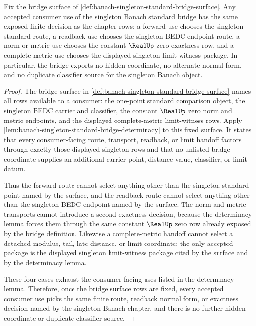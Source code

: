 \begin{corollary}
\label{cor:banach-singleton-standard-bridge-consumer-determinacy}
Fix the bridge surface of
\autoref{def:banach-singleton-standard-bridge-surface}. Any accepted
consumer use of the singleton Banach standard bridge has the same exposed
finite decision as the chapter rows: a forward use chooses the singleton
standard route, a readback use chooses the singleton BEDC endpoint route, a
norm or metric use chooses the constant $\RealUp$ zero exactness row, and a
complete-metric use chooses the displayed singleton limit-witness package. In
particular, the bridge exports no hidden coordinate, no alternate normal form,
and no duplicate classifier source for the singleton Banach object.
\end{corollary}
\begin{proof}
The bridge surface in
\autoref{def:banach-singleton-standard-bridge-surface} names all rows available
to a consumer: the one-point standard comparison object, the singleton BEDC
carrier and classifier, the constant $\RealUp$ zero norm and metric endpoints,
and the displayed complete-metric limit-witness rows. Apply
\autoref{lem:banach-singleton-standard-bridge-determinacy} to this fixed
surface. It states that every consumer-facing route, transport, readback, or
limit handoff factors through exactly those displayed singleton rows and that
no unlisted bridge coordinate supplies an additional carrier point, distance
value, classifier, or limit datum.

Thus the forward route cannot select anything other than the singleton
standard point named by the surface, and the readback route cannot select
anything other than the singleton BEDC endpoint named by the surface. The norm
and metric transports cannot introduce a second exactness decision, because
the determinacy lemma forces them through the same constant $\RealUp$ zero row
already exposed by the bridge definition. Likewise a complete-metric handoff
cannot select a detached modulus, tail, late-distance, or limit coordinate:
the only accepted package is the displayed singleton limit-witness package
cited by the surface and by the determinacy lemma.

These four cases exhaust the consumer-facing uses listed in the determinacy
lemma. Therefore, once the bridge surface rows are fixed, every accepted
consumer use picks the same finite route, readback normal form, or exactness
decision named by the singleton Banach chapter, and there is no further hidden
coordinate or duplicate classifier source.
\end{proof}
